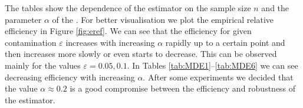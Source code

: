 The tables show the dependence of the \ren estimator on the sample size $n$ and the parameter $\alpha$ of the \mRao. For better visualisation we plot the empirical relative efficiency in Figure \ref{fig:eref}. We can see that the efficiency for given contamination $\varepsilon$ increases with increasing $\alpha$ rapidly up to a certain point and then increases more slowly or even starts to decrease. This can be observed mainly for the values $\varepsilon=0.05, 0.1$. In Tables \ref{tab:MDE1}--\ref{tab:MDE6} we can see decreasing efficiency with increasing  $\alpha$. After some experiments we decided that the value $\alpha \approx 0.2 $ is a good compromise between the efficiency and robustness of the estimator.
\newpage
\changetext{}{+12em}{-6em}{-6em}{}
\begin{landscape}
		
%		
\end{landscape}
\changetext{}{-12em}{+6em}{+6em}{}





 